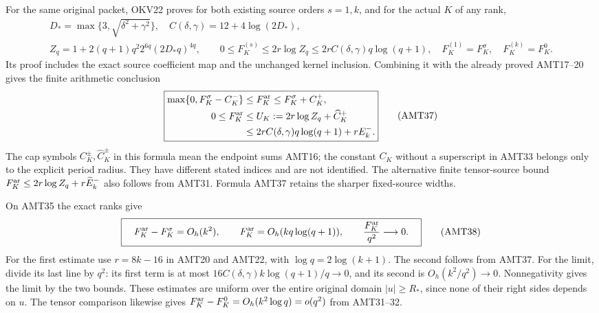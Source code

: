 \documentclass[11pt,a4paper]{article}
\begin{document}
For the same original packet, OKV22 proves for both existing source
orders $s=1,k$, and for the actual $K$ of any rank,
\[
\begin{gathered}
 D_*=\max\{3,\sqrt{\delta^2+\gamma^2}\},\quad
 C(\delta,\gamma)=12+4\log(2D_*),\\
 Z_q=1+2(q+1)q^2 2^{6q}(2D_*q)^{4q},\qquad
 0\le F_K^{(s)}\le2r\log Z_q
                \le2r C(\delta,\gamma)q\log(q+1),
 \quad F_K^{(1)}=F_K^\sigma,\quad F_K^{(k)}=F_K^0.
\end{gathered}\tag{AMT36}
\]
Its proof includes the exact source coefficient map and the unchanged
kernel inclusion. Combining it with the already proved AMT17--20
gives the finite arithmetic conclusion
\[
\boxed{\begin{split}
 \max\{0,F_K^\sigma-C_K^-\}
       &\le F_K^{\rm ar}\le F_K^\sigma+C_K^+,\\
 0\le F_K^{\rm ar}
       &\le U_K:=2r\log Z_q+\widehat C_K^+\\
       &\le2r C(\delta,\gamma)q\log(q+1)+rE_k^-.
\end{split}}\tag{AMT37}
\]
The cap symbols $C_K^\pm,\widehat C_K^\pm$ in this formula mean
the endpoint sums AMT16; the constant $C_K$ without a superscript
in AMT33 belongs only to the explicit period radius. They have
different stated indices and are not identified.
The alternative finite tensor-source bound
$F_K^{\rm ar}\le2r\log Z_q+r\widetilde E_k^-$ also follows from
AMT31. Formula AMT37 retains the sharper fixed-source widths.

On AMT35 the exact ranks give
\[
 \boxed{\quad F_K^{\rm ar}-F_K^\sigma=O_h(k^2),\qquad
 F_K^{\rm ar}=O_h(kq\log(q+1)),\qquad
 \frac{F_K^{\rm ar}}{q^2}\longrightarrow0.\quad}
 \tag{AMT38}
\]
For the first estimate use $r=8k-16$ in AMT20 and AMT22,
with $\log q=2\log(k+1)$. The second follows from AMT37.
For the limit, divide its last line by $q^2$: its first term is
at most $16C(\delta,\gamma)k\log(q+1)/q\to0$, and its second
is $O_h(k^2/q^2)\to0$. Nonnegativity gives the limit by the two
bounds. These estimates are uniform over the entire original
domain $|u|\ge R_*$, since none of their right sides depends on $u$.
The tensor comparison likewise gives
$F_K^{\rm ar}-F_K^0=O_h(k^2\log q)=o(q^2)$ from AMT31--32.
\end{document}

